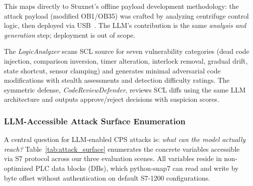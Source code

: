 This maps directly to Stuxnet's offline payload development methodology: the attack payload (modified OB1/OB35) was crafted by analyzing centrifuge control logic, then deployed via USB~\cite{falliere2011w32}. The LLM's contribution is the same \emph{analysis and generation} step; deployment is out of scope.

The \emph{LogicAnalyzer} scans SCL source for seven vulnerability categories (dead code injection, comparison inversion, timer alteration, interlock removal, gradual drift, state shortcut, sensor clamping) and generates minimal adversarial code modifications with stealth assessments and detection difficulty ratings. The symmetric defense, \emph{CodeReviewDefender}, reviews SCL diffs using the same LLM architecture and outputs approve/reject decisions with suspicion scores.

\subsubsection{LLM-Accessible Attack Surface Enumeration}
\label{sec:threat:attack_surface}

A central question for LLM-enabled CPS attacks is: \emph{what can the model actually reach?} Table~\ref{tab:attack_surface} enumerates the concrete variables accessible via S7 protocol across our three evaluation scenes. All variables reside in non-optimized PLC data blocks (DBs), which python-snap7 can read and write by byte offset without authentication on default S7-1200 configurations.

